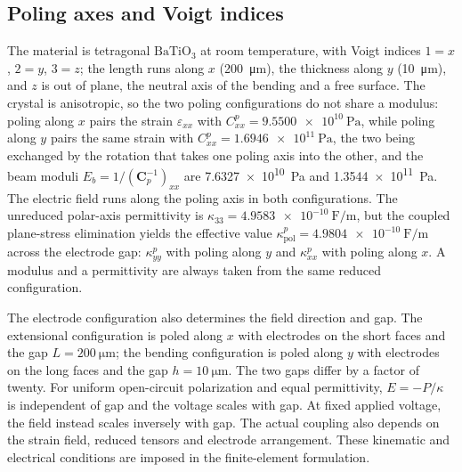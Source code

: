 \FloatBarrier
\subsection{Poling axes and Voigt indices}
\label{sec:axes}

The material is tetragonal $\mathrm{BaTiO_3}$ at room temperature, with Voigt
indices $1=x$, $2=y$, $3=z$; the length runs along $x$
(\SI{200}{\micro\meter}), the thickness along $y$ (\SI{10}{\micro\meter}), and
$z$ is out of plane, the neutral axis of the bending and a free surface. The
crystal is anisotropic, so the two poling configurations
do not share a modulus: poling along $x$ pairs the strain $\varepsilon_{xx}$
with $C^{p}_{xx}=\SI{9.5500e10}{\pascal}$, while poling along $y$ pairs the
same strain with $C^{p}_{xx}=\SI{1.6946e11}{\pascal}$, the two being exchanged
by the rotation that takes one poling axis into the other, and the beam moduli
$E_b=1/(\bm C_p^{-1})_{xx}$ are \SI{7.6327e10}{\pascal} and
\SI{1.3544e11}{\pascal}. The electric field runs along the poling axis in
both configurations. The unreduced polar-axis permittivity is
$\kappa_{33}=\SI{4.9583e-10}{\farad\per\meter}$, but the coupled
plane-stress elimination yields the effective value
$\kappa^{p}_{\mathrm{pol}}=\SI{4.9804e-10}{\farad\per\meter}$
across the electrode gap: $\kappa^{p}_{yy}$ with poling along $y$ and
$\kappa^{p}_{xx}$ with poling along $x$. A modulus and a permittivity are
always taken from the same reduced configuration.

The electrode configuration also determines the field direction and gap. The
extensional configuration is poled along $x$ with electrodes on the short
faces and the gap $L=\SI{200}{\micro\meter}$; the bending configuration is
poled along $y$ with electrodes on the long faces and the gap
$h=\SI{10}{\micro\meter}$. The two gaps differ by a factor of twenty.
For uniform open-circuit polarization and equal permittivity, $E=-P/\kappa$
is independent of gap and the voltage scales with gap. At fixed applied
voltage, the field instead scales inversely with gap. The actual coupling
also depends on the strain field, reduced tensors and electrode arrangement. These kinematic and electrical conditions are imposed in the finite-element
formulation.

\FloatBarrier
